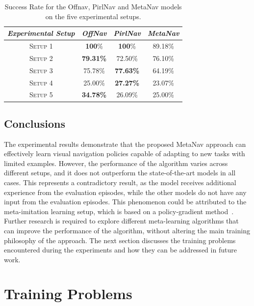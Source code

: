 \begin{table}
    \centering
    \begin{tabular}{c|ccc}
        \toprule
        \textit{Experimental Setup} & \textit{OffNav}  & \textit{PirlNav} & \textit{MetaNav} \\
        \midrule
        \textsc{Setup 1}            & \textbf{100}\%   & \textbf{100}\%   & 89.18\%          \\
        \textsc{Setup 2}            & \textbf{79.31\%} & 72.50\%          & 76.10\%          \\
        \textsc{Setup 3}            & 75.78\%          & \textbf{77.63\%} & 64.19\%          \\
        \textsc{Setup 4}            & 25.00\%          & \textbf{27.27\%} & 23.07\%          \\
        \textsc{Setup 5}            & \textbf{34.78\%} & 26.09\%          & 25.00\%          \\
        \bottomrule
    \end{tabular}
    \caption{Success Rate for the Offnav, PirlNav and MetaNav models on the five experimental setups.}
    \label{tab:metanav_comparison}
\end{table}

\subsection{Conclusions}\label{subsec:conclusions_metanav}

The experimental results demonstrate that the proposed MetaNav approach can effectively learn visual navigation policies capable of adapting to new tasks with limited examples.
However, the performance of the algorithm varies across different setups, and it does not outperform the state-of-the-art models in all cases.
This represents a contradictory result, as the model receives additional experience from the evaluation episodes, while the other models do not have any input from the evaluation episodes.
This phenomenon could be attributed to the meta-imitation learning setup, which is based on a policy-gradient method~\cite{Beck_2025}.
Further research is required to explore different meta-learning algorithms that can improve the performance of the algorithm, without altering the main training philosophy of the approach.
The next section discusses the training problems encountered during the experiments and how they can be addressed in future work.

\section{Training Problems}\label{sec:training-problems}

